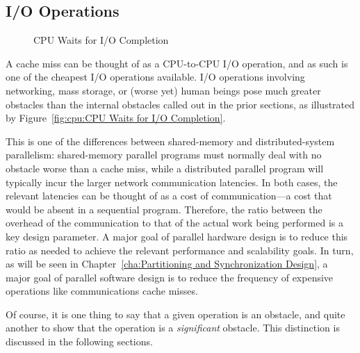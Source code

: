 \subsection{I/O Operations}
\label{sec:cpu:I/O Operations}

\begin{figure}[tb]
\centering
{}
\caption{CPU Waits for I/O Completion}
\end{figure}

A cache miss can be thought of as a CPU-to-CPU I/O operation, and as
such is one of the cheapest I/O operations available.
I/O operations involving networking, mass storage, or (worse yet) human
beings pose much greater obstacles than the internal obstacles called
out in the prior sections,
as illustrated by
Figure~\ref{fig:cpu:CPU Waits for I/O Completion}.

This is one of the differences between shared-memory and distributed-system
parallelism: shared-memory parallel programs must normally deal with no
obstacle worse than a cache miss, while a distributed parallel program
will typically incur the larger network communication latencies.
In both cases, the relevant latencies can be thought of as a cost of
communication---a cost that would be absent in a sequential program.
Therefore, the ratio between the overhead of the communication to
that of the actual work being performed is a key design parameter.
A major goal of parallel hardware design is to reduce this ratio as
needed to achieve the relevant performance and scalability goals.
In turn, as will be seen in
Chapter~\ref{cha:Partitioning and Synchronization Design},
a major goal of parallel software design is to reduce the
frequency of expensive operations like communications cache misses.

Of course, it is one thing to say that a given operation is an obstacle,
and quite another to show that the operation is a \emph{significant}
obstacle.
This distinction is discussed in the following sections.
